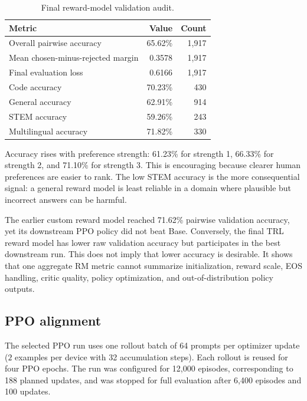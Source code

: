 \documentclass[11pt]{article}
\newcommand{\trl}{\textsc{TRL}}
\begin{document}
\begin{table}[H]
\centering
\caption{Final reward-model validation audit.}
\label{tab:rm}
\begin{tabular}{@{}lrr@{}}
\toprule
\textbf{Metric} & \textbf{Value} & \textbf{Count}\\
\midrule
Overall pairwise accuracy & 65.62\% & 1,917\\
Mean chosen-minus-rejected margin & 0.3578 & 1,917\\
Final evaluation loss & 0.6166 & 1,917\\
\midrule
Code accuracy & 70.23\% & 430\\
General accuracy & 62.91\% & 914\\
STEM accuracy & 59.26\% & 243\\
Multilingual accuracy & 71.82\% & 330\\
\bottomrule
\end{tabular}
\end{table}

Accuracy rises with preference strength: 61.23\% for strength 1,
66.33\% for strength 2, and 71.10\% for strength 3. This is encouraging
because clearer human preferences are easier to rank. The low STEM accuracy is
the more consequential signal: a general reward model is least reliable in a
domain where plausible but incorrect answers can be harmful.

The earlier custom reward model reached 71.62\% pairwise validation accuracy,
yet its downstream PPO policy did not beat Base. Conversely, the final
\trl{} reward model has lower raw validation accuracy but participates in the
best downstream run. This does not imply that lower accuracy is desirable. It
shows that one aggregate RM metric cannot summarize initialization, reward
scale, EOS handling, critic quality, policy optimization, and
out-of-distribution policy outputs.

\subsection{PPO alignment}

The selected PPO run uses one rollout batch of 64 prompts per optimizer update
($2$ examples per device with 32 accumulation steps). Each rollout is reused
for four PPO epochs. The run was configured for 12,000 episodes, corresponding
to 188 planned updates, and was stopped for full evaluation after 6,400
episodes and 100 updates.
\end{document}
